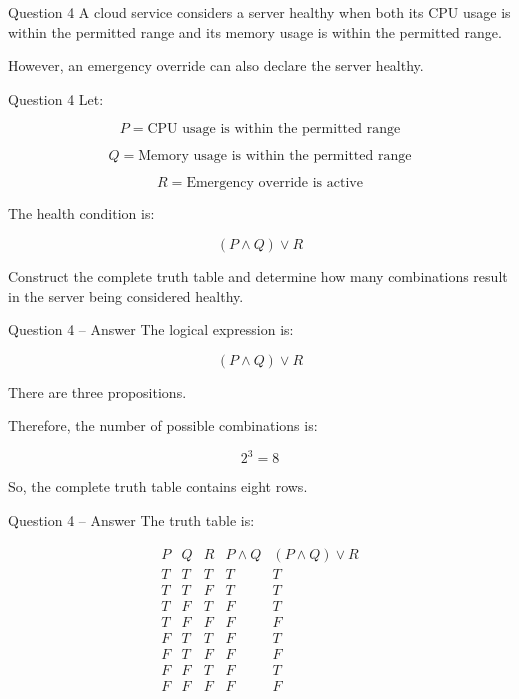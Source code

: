 
\begin{frame}{Question 4}
A cloud service considers a server healthy when both its CPU usage is within
the permitted range and its memory usage is within the permitted range.

However, an emergency override can also declare the server healthy.
\end{frame}

\begin{frame}{Question 4}
Let:

$$
P = \text{CPU usage is within the permitted range}
$$

$$
Q = \text{Memory usage is within the permitted range}
$$

$$
R = \text{Emergency override is active}
$$

The health condition is:

$$
(P \land Q) \lor R
$$

Construct the complete truth table and determine how many combinations
result in the server being considered healthy.
\end{frame}

\begin{frame}{Question 4 -- Answer}
The logical expression is:

$$
(P \land Q) \lor R
$$

There are three propositions.

Therefore, the number of possible combinations is:

$$
2^3=8
$$

So, the complete truth table contains eight rows.
\end{frame}


\begin{frame}{Question 4 -- Answer}
The truth table is:

$$
\begin{matrix}
P & Q & R & P\land Q & (P\land Q)\lor R \\
T & T & T & T & T \\
T & T & F & T & T \\
T & F & T & F & T \\
T & F & F & F & F \\
F & T & T & F & T \\
F & T & F & F & F \\
F & F & T & F & T \\
F & F & F & F & F
\end{matrix}
$$

\end{frame}

